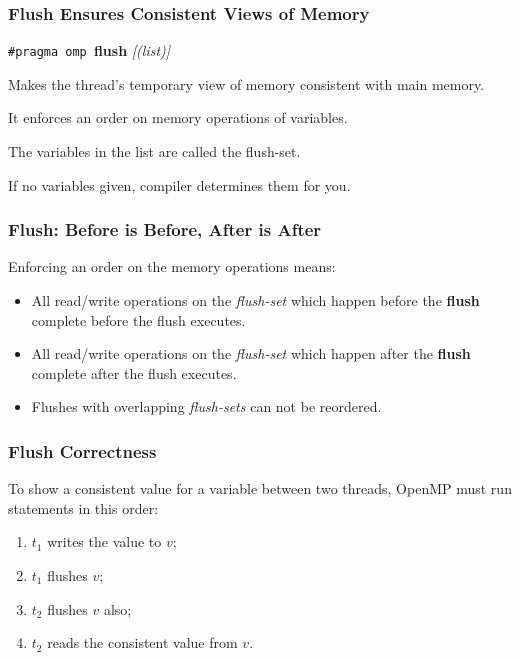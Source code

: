 \begin{frame}[fragile]
  \frametitle{Flush Ensures Consistent Views of Memory}
\large
  \begin{center}
    {\tt \#pragma omp }{\bf flush} {\it[(list)]}
  \end{center}

    Makes the thread's temporary view of memory consistent with main
      memory.
    
    It enforces an order on memory operations of variables.
    
    The variables in the list are called the \alert{flush-set}.
    
    If no variables given, compiler determines them for you.
 
  
\end{frame}

\begin{frame}
  \frametitle{Flush: Before is Before, After is After}

  
\large
  Enforcing an order on the memory operations means:

  \begin{itemize}
    \item All read/write operations on the {\it flush-set} which happen
      before the {\bf flush} complete before the flush executes.
    \item All read/write operations on the {\it flush-set} which happen
      after the {\bf flush} complete after the flush executes.
    \item Flushes with overlapping {\it flush-sets} can not be reordered.
  \end{itemize}
  
\end{frame}

\begin{frame}
  \frametitle{Flush Correctness}
  
  To show a consistent value for a variable between two threads, 
  OpenMP must run statements in this order:

  \begin{enumerate}
    \item $t_1$ writes the value to $v$;
    \item $t_1$ flushes $v$; 
    \item $t_2$ flushes $v$ also;
    \item $t_2$ reads the consistent value from $v$.
  \end{enumerate}

\end{frame}

